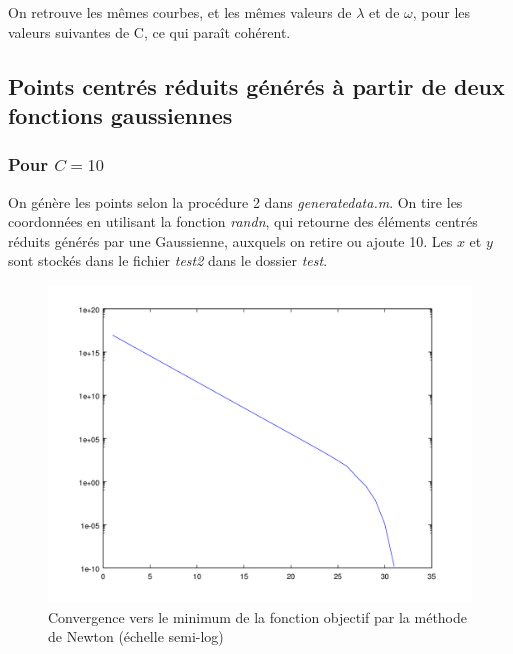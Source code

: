 \documentclass{article}
\begin{document}
On retrouve les mêmes courbes, et les mêmes valeurs de $\lambda$ et de $\omega$, pour les valeurs suivantes de C, ce qui paraît cohérent.

\subsection{Points centrés réduits générés à partir de deux fonctions gaussiennes}

\subsubsection{Pour $C = 10$}

On génère les points selon la procédure 2 dans \emph{generatedata.m}. On tire les coordonnées en utilisant la fonction \emph{randn}, qui retourne des éléments centrés réduits générés par une Gaussienne, auxquels on retire ou ajoute 10. Les $x$ et $y$ sont stockés dans le fichier \emph{test2} dans le dossier \emph{test}.

         \begin{figure}
           \begin{center}
             \subfigure\includegraphics[scale=0.3]{images/cvnewton2.png}
             \caption{Convergence vers le minimum de la fonction objectif par la méthode de Newton (échelle semi-log)}
           \end{center}
         \end{figure}
\end{document}
